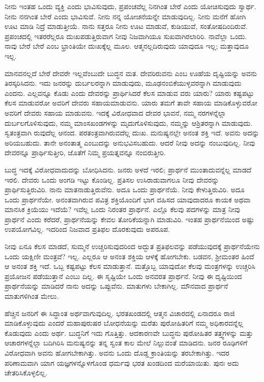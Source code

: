 ನೀನು ಇಂತಹ ಒಂದು ವ್ಯಕ್ತಿ ಎಂದು ಭಾವಿಸುವುದು, ಪ್ರಪಂಚವೆಲ್ಲ ನಿನಗಿಂತ ಬೇರೆ ಎಂದು ಯೋಚಿಸುವುದು ಸ್ವಾರ್ಥ. ನೀನು ನನಗಿಂತ ಬೇರೆ ಎಂದು ಭಾವಿಸುವೆ. ನೀನು ನನ್ನ ಯೋಚನೆಯನ್ನೇ ಮಾಡುವುದಿಲ್ಲ. ನೀನು ಮನೆಗೆ ಹೋಗಿ ಊಟ ಮಾಡಿ ನಿದ್ರೆ ಮಾಡುತ್ತೀಯೆ. ನಾನು ಸತ್ತರೂ ನೀನು ಊಟ ಮಾಡುವೆ, ಕುಡಿಯುವೆ, ಸಂತೋಷದಿಂದಿರುವೆ. ಪ್ರಪಂಚದಲ್ಲಿ ಇತರರೆಲ್ಲರೂ ದುಃಖಪಡುತ್ತಿರುವಾಗ ನೀವು ನಿಜವಾಗಿಯೂ ಸುಖವಾಗಿರಲಾರಿರಿ. ನಾವೆಲ್ಲಾ ಒಂದು. ನಾವು ಬೇರೆ ಬೇರೆ ಎಂಬ ಭ್ರಾಂತಿಯೇ ದುಃಖಕ್ಕೆಲ್ಲ ಮೂಲ. ಆತ್ಮನಲ್ಲದಿರುವುದು ಯಾವುದೂ ಇಲ್ಲ; ಮತ್ತಾವುದೂ ಇಲ್ಲ.

ಮಾನವನಲ್ಲದೆ ಬೇರೆ ದೇವರೇ ಇಲ್ಲವೆಂಬುದೇ ಬುದ್ಧನ ಮತ. ದೇವರಿರುವನು ಎಂಬ ಊಹೆಯ ದೃಷ್ಟಿಯನ್ನು ಅವನು ತಿರಸ್ಕರಿಸಿದನು. ಇದು ಜನರನ್ನು ದುರ್ಬಲರನ್ನಾಗಿ ಮಾಡುವುದು, ಮೂಢನಂಬಿಕೆಯುಳ್ಳವರನ್ನಾಗಿ ಮಾಡುವುದು ಎಂದನು. ಎಲ್ಲವನ್ನೂ ಕೊಡು ಎಂದು ದೇವರನ್ನು ಪ್ರಾರ್ಥಿಸಿದರೆ ಕೆಲಸ ಮಾಡುವ ವರು ಯಾರು? ಯಾರು ಕಷ್ಟಪಟ್ಟು ಕೆಲಸ ಮಾಡುವರೋ ಅವರಿಗೆ ದೇವರು ಸಹಾಯಮಾಡುವನು. ಯಾರು ತಮಗೆ ತಾವೇ ಸಹಾಯ ಮಾಡಿಕೊಳ್ಳುವರೋ ಅವರಿಗೆ ದೇವರು ಸಹಾಯ ಮಾಡುವನು. ಇದಕ್ಕೆ ವಿರೋಧವಾದ ದೇವರ ಭಾವನೆ, ನಮ್ಮ ನರಗಳನ್ನೆಲ್ಲಾ ದುರ್ಬಲಗೊಳಿಸುವುದು, ನಮ್ಮ ಮಾಂಸಖಂಡಗಳನ್ನು ಮೃದುಗೊಳಿಸುವುದು, ನಮ್ಮನ್ನು ಆಶ್ರಿತರನ್ನಾಗಿ ಮಾಡುವುದು. ಸ್ವತಂತ್ರವಾಗಿ ರುವುದೆಲ್ಲ ಆನಂದ. ಪರತಂತ್ರವಾಗಿರುವದೆಲ್ಲ ದುಃಖ. ಮನುಷ್ಯನಲ್ಲೇ ಅನಂತ ಶಕ್ತಿ ಇದೆ. ಅವನು ಅದನ್ನು ಅರಿಯಬಹುದು. ತಾನೇ ಅನಂತಾತ್ಮ ಎಂಬುದನ್ನು ಅನುಭವಿಸಬಹುದು. ಆದರೆ ನೀವು ಅದನ್ನು ನಂಬುವುದಿಲ್ಲ. ನೀವು ದೇವರನ್ನೂ ಪ್ರಾರ್ಥಿಸುತ್ತೀರಿ, ಜೊತೆಗೆ ನಿಮ್ಮ ಪ್ರಯತ್ನವನ್ನೂ ನಂಬಿರುತ್ತೀರಿ.

ಬುದ್ಧ ಇದಕ್ಕೆ ವಿರೋಧವಾದುದನ್ನು ಬೋಧಿಸಿದನು. ಜನರು ಅಳದೆ ಇರಲಿ; ಪ್ರಾರ್ಥನೆ ಮುಂತಾದುವನ್ನೆಲ್ಲ ಮಾಡದೆ ಇರಲಿ. ದೇವರು ಒಂದು ಅಂಗಡಿ ಇಟ್ಟು ಕೊಂಡಿಲ್ಲ. ಪ್ರತಿಸಲ ಉಸಿರಾಡುವಾಗಲೂ ನೀವು ದೇವರನ್ನು ಪ್ರಾರ್ಥಿಸುತ್ತಿರುವಿರಿ. ನಾನು ಮಾತನಾಡುತ್ತಿರುವೆನು. ಅದೂ ಒಂದು ಪ್ರಾರ್ಥನೆಯೆ. ನೀವು ಕೇಳುತ್ತಿರುವಿರಿ. ಅದೂ ಒಂದು ಪ್ರಾರ್ಥನೆಯೇ. ಅನಂತವಾಗಿರುವ ಪವಿತ್ರ ಶಕ್ತಿಯೊಂದಿಗೆ ಭಾಗ ವಹಿಸದ ಯಾವುದಾದರೂ ಕಾಯಕ ಅಥವಾ ಮಾನಸಿಕ ಕ್ರಿಯೆಯು ಇದೆಯೆ? ಇವೆಲ್ಲ ಒಂದು ನಿರಂತರ ಪ್ರಾರ್ಥನೆ. ಎಲ್ಲೊ ಕೆಲವು ಪದಗಳನ್ನು ಮಾತ್ರ ನೀವು ಪ್ರಾರ್ಥನೆ ಎಂದು ಕರೆದರೆ, ಪ್ರಾರ್ಥನೆಯನ್ನು ಕೇವಲ ತೋರಿಕೆಯನ್ನಾಗಿ ಮಾಡುವಿರಿ. ಇಂತಹ ಪ್ರಾರ್ಥನೆಯಿಂದ ಅಷ್ಟು ಉಪಯೋಗವಿಲ್ಲ. ಇದರಿಂದ ನಿಜವಾದ ಪ್ರತಿಫಲ ದೊರಕುವುದು ಅಪರೂಪ.

ನೀವು ಏನೂ ಕೆಲಸ ಮಾಡದೆ, ಸುಮ್ಮನೆ ಉಚ್ಚರಿಸುವುದರಿಂದ ಅದ್ಭುತ ಪ್ರತಿಫಲವನ್ನು ಪಡೆಯುವುದಕ್ಕೆ ಪ್ರಾರ್ಥನೆಯೇನು ಒಂದು ಯಕ್ಷಿಣೀ ಮಂತ್ರವೆ? ಇಲ್ಲ. ಎಲ್ಲರೂ ಆ ಅನಂತ ಶಕ್ತಿಯ ಆಳಕ್ಕೆ ಹೋಗಬೇಕು. ಬಡವನ, ಶ‍್ರೀಮಂತರ ಹಿಂದೆ ಆ ಅನಂತ ಶಕ್ತಿ ಇದೆ. ಒಬ್ಬ ಕಷ್ಟಪಟ್ಟು ಕೆಲಸ ಮಾಡುತ್ತಾನೆ. ಮತ್ತೊಬ್ಬ ಯಾವುದೋ ಕೆಲವು ಮಂತ್ರಗಳನ್ನು ಉಚ್ಚರಿಸಿ ಪ್ರಯೋಜನ ಪಡೆಯುತ್ತಾನೆ ಎಂಬು ದಿಲ್ಲ. ಈ ಸೃಷ್ಟಿಯೇ ಒಂದು ಅನವರತ ಪ್ರಾರ್ಥನೆ. ನೀವು ಈ ದೃಷ್ಟಿಯಿಂದ ಪ್ರಾರ್ಥನೆಯನ್ನು ಮಾಡಿದರೆ ನಾನು ಅದನ್ನು ಒಪ್ಪುವೆನು. ಮಾತುಗಳು ಬೇಕಾಗಿಲ್ಲ. ಮೌನವಾದ ಪ್ರಾರ್ಥನೆ ಮಾತುಗಳಿಗಿಂತ ಮೇಲು.

ಹೆಚ್ಚಿನ ಜನರಿಗೆ ಈ ಸಿದ್ಧಾಂತ ಅರ್ಥವಾಗುವುದಿಲ್ಲ. ಭರತಖಂಡದಲ್ಲಿ ಆತ್ಮನ ವಿಚಾರದಲ್ಲಿ ಏನಾದರೂ ರಾಜಿ ಮಾಡಿಕೊಳ್ಳುವುದು ಎಂದರೆ ಮಹಾಪುರುಷರ ಬೋಧನೆಯನ್ನು ಮರೆತು ಪುರೋಹಿತರಿಗೆ ನಮ್ಮ ಅಧಿಕಾರವನ್ನೆಲ್ಲ ಕೊಡುವುದು ಎಂದು ಅರ್ಥ. ಬುದ್ಧನಿಗೆ ಇದು ಗೊತ್ತಿತ್ತು. ಆದಕಾರಣವೇ ಬುದ್ಧನು ಪುರೋಹಿತರ ತತ್ತ್ವಗಳನ್ನು ಮತ್ತು ಆಚಾರಗಳನ್ನೆಲ್ಲಾ ಬದಿಗಿರಿಸಿ ಮನುಷ್ಯನನ್ನು ತನ್ನ ಸ್ವಂತ ಕಾಲ ಮೇಲೆ ನಿಲ್ಲುವಂತೆ ಮಾಡಿದನು. ಜನರ ರೂಢಿಗಳಿಗೆ ವಿರೋಧವಾಗಿ ಅವನು ಹೋಗಬೇಕಾಗಿತ್ತು. ಅವನು ಒಂದು ದೊಡ್ಡ ಕ್ರಾಂತಿಯನ್ನು ತರಬೇಕಾಗಿತ್ತು. ಇದರ ಪರಿಣಾಮವಾಗಿ ಯಾಗ ಯಜ್ಞಗಳನ್ನೊಳಗೊಂಡ ಧರ್ಮವು ಭರತ ಖಂಡದಿಂದ ಮರೆಯಾಯಿತು. ಪುನಃ ಅದು ಚೇತರಿಸಿಕೊಳ್ಳಲಿಲ್ಲ.

